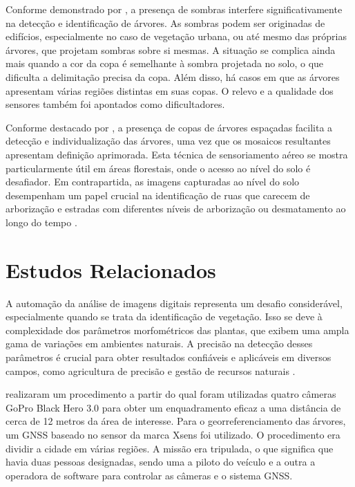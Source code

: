\documentclass[
    12pt,                   %
    openright,              %
    oneside,                %
    a4paper,                %
    sumario=tradicional,    %
    english,                %
    brazil,                 %
    ]{abntex2}
\begin{document}
    Conforme demonstrado por \textcite{neto2012detecccao}, a presença de sombras interfere significativamente na detecção e identificação de árvores. As sombras podem ser originadas de edifícios, especialmente no caso de vegetação urbana, ou até mesmo das próprias árvores, que projetam sombras sobre si mesmas. A situação se complica ainda mais quando a cor da copa é semelhante à sombra projetada no solo, o que dificulta a delimitação precisa da copa. Além disso, há casos em que as árvores apresentam várias regiões distintas em suas copas. O relevo e a qualidade dos sensores também foi apontados como dificultadores.

    Conforme destacado por \textcite{Arantes_Arantes_Santos_Ventura_Gomes_2020}, a presença de copas de árvores espaçadas facilita a detecção e individualização das árvores, uma vez que os mosaicos resultantes apresentam definição aprimorada. Esta técnica de sensoriamento aéreo se mostra particularmente útil em áreas florestais, onde o acesso ao nível do solo é desafiador. Em contrapartida, as imagens capturadas ao nível do solo desempenham um papel crucial na identificação de ruas que carecem de arborização e estradas com diferentes níveis de arborização ou desmatamento ao longo do tempo \cite{DBLP:journals/corr/abs-2201-06569}.

\section{Estudos Relacionados}
    A automação da análise de imagens digitais representa um desafio considerável, especialmente quando se trata da identificação de vegetação. Isso se deve à complexidade dos parâmetros morfométricos das plantas, que exibem uma ampla gama de variações em ambientes naturais. A precisão na detecção desses parâmetros é crucial para obter resultados confiáveis e aplicáveis em diversos campos, como agricultura de precisão e gestão de recursos naturais \cite{sa2021detecccao}.

    \textcite{barbosa2018quantificaccao} realizaram um procedimento a partir do qual foram utilizadas quatro câmeras GoPro Black Hero 3.0 para obter um enquadramento eficaz a uma distância de cerca de 12 metros da área de interesse. Para o georreferenciamento das árvores, um GNSS baseado no sensor da marca Xsens foi utilizado. O procedimento era dividir a cidade em várias regiões. A missão era tripulada, o que significa que havia duas pessoas designadas, sendo uma a piloto do veículo e a outra a operadora de software para controlar as câmeras e o sistema GNSS.
\end{document}
